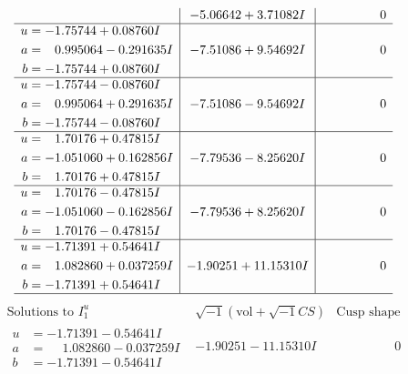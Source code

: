 \documentclass[1p]{elsarticle_modified}
\theoremstyle{definition}
\newcommand{\I}{\sqrt{-1}}
\begin{document}
$$\begin{array}{c|c|c}
 & -5.06642 + 3.71082 I & \phantom{-0.000000 } 0 \\ \hline\begin{aligned}
u &= -1.75744 + 0.08760 I \\
a &= \phantom{-}0.995064 - 0.291635 I \\
b &= -1.75744 + 0.08760 I\end{aligned}
 & -7.51086 + 9.54692 I & \phantom{-0.000000 } 0 \\ \hline\begin{aligned}
u &= -1.75744 - 0.08760 I \\
a &= \phantom{-}0.995064 + 0.291635 I \\
b &= -1.75744 - 0.08760 I\end{aligned}
 & -7.51086 - 9.54692 I & \phantom{-0.000000 } 0 \\ \hline\begin{aligned}
u &= \phantom{-}1.70176 + 0.47815 I \\
a &= -1.051060 + 0.162856 I \\
b &= \phantom{-}1.70176 + 0.47815 I\end{aligned}
 & -7.79536 - 8.25620 I & \phantom{-0.000000 } 0 \\ \hline\begin{aligned}
u &= \phantom{-}1.70176 - 0.47815 I \\
a &= -1.051060 - 0.162856 I \\
b &= \phantom{-}1.70176 - 0.47815 I\end{aligned}
 & -7.79536 + 8.25620 I & \phantom{-0.000000 } 0 \\ \hline\begin{aligned}
u &= -1.71391 + 0.54641 I \\
a &= \phantom{-}1.082860 + 0.037259 I \\
b &= -1.71391 + 0.54641 I\end{aligned}
 & -1.90251 + 11.15310 I & \phantom{-0.000000 } 0\\
 \hline 
 \end{array}$$\newpage$$\begin{array}{c|c|c}  
\text{Solutions to }I^u_{1}& \I (\text{vol} + \sqrt{-1}CS) & \text{Cusp shape}\\
 \hline 
\begin{aligned}
u &= -1.71391 - 0.54641 I \\
a &= \phantom{-}1.082860 - 0.037259 I \\
b &= -1.71391 - 0.54641 I\end{aligned}
 & -1.90251 - 11.15310 I & \phantom{-0.000000 } 0 \\ \hline\begin{aligned}

\end{aligned}
\end{array}$$
\end{document}
